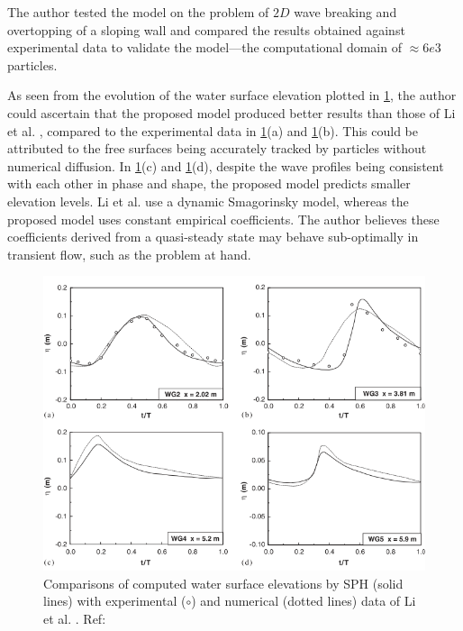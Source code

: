 The author tested the model on the problem of $2D$ wave breaking and overtopping of a sloping wall and compared the results obtained against experimental data \parencite{li2004wave} to validate the model—the computational domain of $\approx 6e3$ particles.

As seen from the evolution of the water surface elevation plotted in \ref{fig:Shao2006-water-surf-elevations}, the author could ascertain that the proposed model produced better results than those of Li et al. \parencite{li2004wave}, compared to the experimental data in \ref{fig:Shao2006-water-surf-elevations}(a) and \ref{fig:Shao2006-water-surf-elevations}(b). This could be attributed to the free surfaces being accurately tracked by particles without numerical diffusion. 
In \ref{fig:Shao2006-water-surf-elevations}(c) and \ref{fig:Shao2006-water-surf-elevations}(d), despite the wave profiles being consistent with each other in phase and shape, the proposed model predicts smaller elevation levels. Li et al. use a dynamic Smagorinsky model, whereas the proposed model uses constant empirical coefficients. The author believes these coefficients derived from a quasi-steady state may behave sub-optimally in transient flow, such as the problem at hand.
\begin{figure}[h!]
	\centering
	\includegraphics[scale=0.9]{Figures/research_papers/Shao2006-water-surf-elevations.png}
	\caption{Comparisons of computed water surface elevations by SPH (solid lines) with experimental ($\circ$) and numerical (dotted lines) data of Li et al. \parencite{li2004wave}. Ref: \parencite{Shao2006}}
	\label{fig:Shao2006-water-surf-elevations}
\end{figure}

